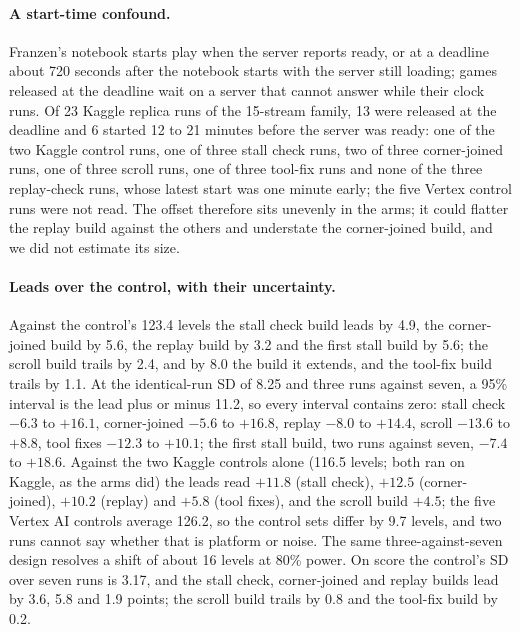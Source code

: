 \paragraph{A start-time confound.}
Franzen's notebook starts play when the server reports ready, or at a deadline about 720 seconds after the notebook starts with the server still loading; games released at the deadline wait on a server that cannot answer while their clock runs. %
Of 23 Kaggle replica runs of the 15-stream family, 13 were released at the deadline and 6 started 12 to 21 minutes before the server was ready: one of the two Kaggle control runs, one of three stall check runs, two of three corner-joined runs, one of three scroll runs, one of three tool-fix runs and none of the three replay-check runs, whose latest start was one minute early; the five Vertex control runs were not read. %
The offset therefore sits unevenly in the arms; it could flatter the replay build against the others and understate the corner-joined build, and we did not estimate its size. %

\paragraph{Leads over the control, with their uncertainty.}
Against the control's 123.4 levels the stall check build leads by 4.9, the corner-joined build by 5.6, the replay build by 3.2 and the first stall build by 5.6; the scroll build trails by 2.4, and by 8.0 the build it extends, and the tool-fix build trails by 1.1. At the identical-run SD of 8.25 and three runs against seven, a 95\% interval is the lead plus or minus 11.2, so every interval contains zero: stall check $-6.3$ to $+16.1$, corner-joined $-5.6$ to $+16.8$, replay $-8.0$ to $+14.4$, scroll $-13.6$ to $+8.8$, tool fixes $-12.3$ to $+10.1$; the first stall build, two runs against seven, $-7.4$ to $+18.6$. %
Against the two Kaggle controls alone (116.5 levels; both ran on Kaggle, as the arms did) the leads read $+11.8$ (stall check), $+12.5$ (corner-joined), $+10.2$ (replay) and $+5.8$ (tool fixes), and the scroll build $+4.5$; the five Vertex AI controls average 126.2, so the control sets differ by 9.7 levels, and two runs cannot say whether that is platform or noise. %
The same three-against-seven design resolves a shift of about 16 levels at 80\% power. %
On score the control's SD over seven runs is 3.17, and the stall check, corner-joined and replay builds lead by 3.6, 5.8 and 1.9 points; the scroll build trails by 0.8 and the tool-fix build by 0.2. %

